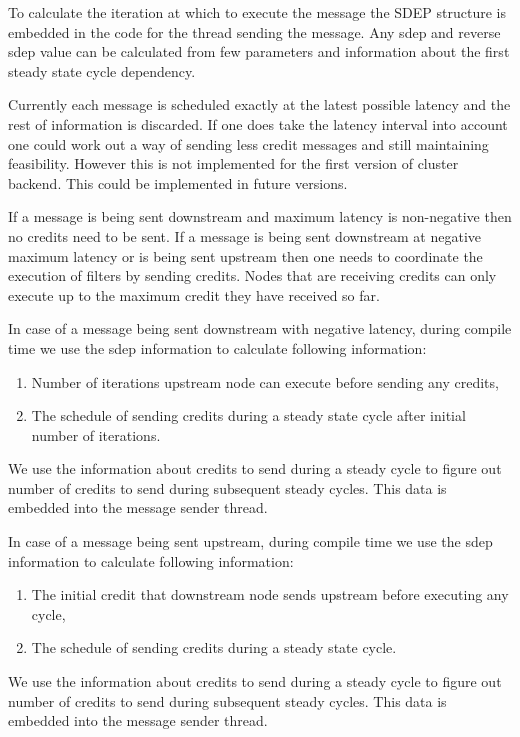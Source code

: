 To calculate the iteration at which to execute the message the SDEP
structure is embedded in the code for the thread sending the
message. Any sdep and reverse sdep value can be calculated from few
parameters and information about the first steady state cycle
dependency.

Currently each message is scheduled exactly at the latest possible
latency and the rest of information is discarded. If one does take the
latency interval into account one could work out a way of sending less
credit messages and still maintaining feasibility. However this is not
implemented for the first version of cluster backend. This could be
implemented in future versions.

If a message is being sent downstream and maximum latency is
non-negative then no credits need to be sent. If a message is being
sent downstream at negative maximum latency or is being sent upstream
then one needs to coordinate the execution of filters by sending
credits. Nodes that are receiving credits can only execute up 
to the maximum credit they have received so far.

In case of a message being sent downstream with negative latency,
during compile time we use the sdep information to calculate following
information:

\begin{enumerate}
\item Number of iterations upstream node can execute before sending any credits,
\item The schedule of sending credits during a steady state cycle after initial number of iterations.
\end{enumerate}

We use the information about credits to send during a steady cycle to
figure out number of credits to send during subsequent steady
cycles. This data is embedded into the message sender thread.

In case of a message being sent upstream, during compile time we use
the sdep information to calculate following information:

\begin{enumerate}
\item The initial credit that downstream node sends upstream before executing any cycle,
\item The schedule of sending credits during a steady state cycle.
\end{enumerate}

We use the information about credits to send during a steady cycle to
figure out number of credits to send during subsequent steady
cycles. This data is embedded into the message sender thread.
